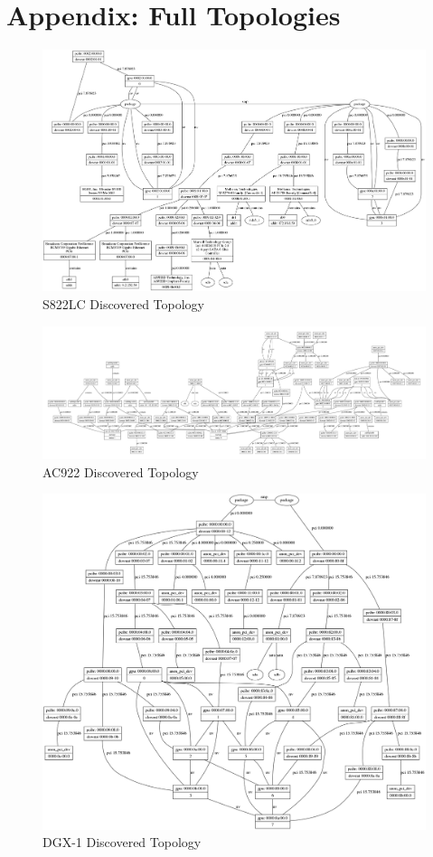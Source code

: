 \chapter{Appendix: Full Topologies}
\label{ch:full-topos}

\begin{figure}[ht]
    \centering
    \includegraphics[width=\textwidth]{figures/topo-minsky-actual.png}
    \caption{S822LC Discovered Topology}
    \label{fig:topo-minsky-actual}
\end{figure}

\begin{figure}[ht]
    \centering
    \includegraphics[width=\textwidth]{figures/topo-ac922-actual.pdf}
    \caption{AC922 Discovered Topology}
    \label{fig:topo-ac922-actual}
\end{figure}

\begin{figure}[ht]
    \centering
    \includegraphics[width=\textwidth]{figures/topo-dgx1-actual.png}
    \caption{DGX-1 Discovered Topology}
    \label{fig:topo-dgx-actual}
\end{figure}